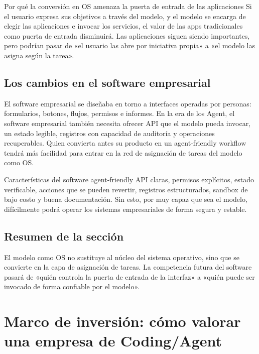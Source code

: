 \documentclass[a4paper]{article}
\begin{document}
\begin{knowledgebox}{Por qué la conversión en OS amenaza la puerta de entrada de las aplicaciones}
Si el usuario expresa sus objetivos a través del modelo, y el modelo se encarga de elegir las aplicaciones e invocar los servicios, el valor de las apps tradicionales como puerta de entrada disminuirá. Las aplicaciones siguen siendo importantes, pero podrían pasar de «el usuario las abre por iniciativa propia» a «el modelo las asigna según la tarea».
\end{knowledgebox}

\subsection{Los cambios en el software empresarial}

El software empresarial se diseñaba en torno a interfaces operadas por personas: formularios, botones, flujos, permisos e informes. En la era de los Agent, el software empresarial también necesita ofrecer API que el modelo pueda invocar, un estado legible, registros con capacidad de auditoría y operaciones recuperables. Quien convierta antes su producto en un agent-friendly workflow tendrá más facilidad para entrar en la red de asignación de tareas del modelo como OS.

\begin{importantbox}{Características del software agent-friendly}
API claras, permisos explícitos, estado verificable, acciones que se pueden revertir, registros estructurados, sandbox de bajo costo y buena documentación. Sin esto, por muy capaz que sea el modelo, difícilmente podrá operar los sistemas empresariales de forma segura y estable.
\end{importantbox}

\subsection{Resumen de la sección}

El modelo como OS no sustituye al núcleo del sistema operativo, sino que se convierte en la capa de asignación de tareas. La competencia futura del software pasará de «quién controla la puerta de entrada de la interfaz» a «quién puede ser invocado de forma confiable por el modelo».
\section{Marco de inversión: cómo valorar una empresa de Coding/Agent}
\end{document}
